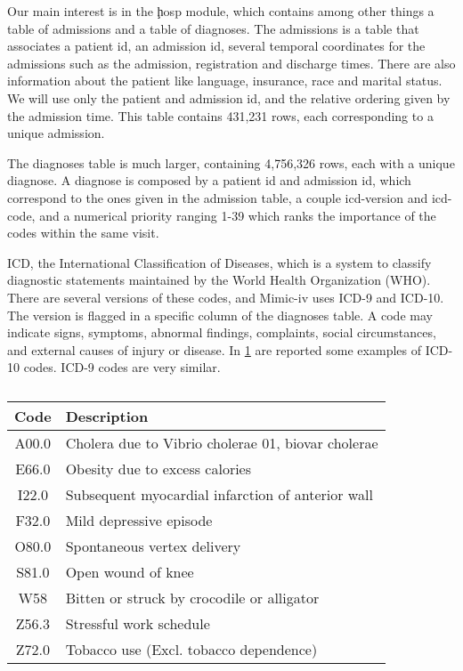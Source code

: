 \documentclass[]{marticle}
\begin{document}
Our main interest is in the \c{hosp} module, which contains among other things a table of admissions
and a table of diagnoses. The admissions is a table that associates a patient id, an admission id,
several temporal coordinates for the admissions such as the admission, registration and discharge
times. There are also information about the patient like language, insurance, race and marital
status. We will use only the patient and admission id, and the relative ordering given by the
admission time. This table contains 431,231 rows, each corresponding to a unique admission. 

The diagnoses table is much larger, containing 4,756,326 rows, each with a unique diagnose. A
diagnose is composed by a patient id and admission id, which correspond to the ones given in the
admission table, a couple icd-version and icd-code, and a numerical priority ranging 1-39 which
ranks the importance of the codes within the same visit.

ICD, the International Classification of Diseases, which is a system to classify diagnostic
statements maintained by the World Health Organization (WHO). There are several versions of these
codes, and Mimic-iv uses ICD-9 and ICD-10. The version is flagged in a specific column of the
diagnoses table. A code may indicate signs, symptoms, abnormal findings, complaints, social
circumstances, and external causes of injury or disease. In \ref{table:icd_examples} are reported some examples
of ICD-10 codes. ICD-9 codes are very similar.

\begin{table}[h]
\begin{center}
\begin{tabular}{  c  l  }
    \hline
    Code & Description \\ 
    \hline
    A00.0 & Cholera due to Vibrio cholerae 01, biovar cholerae \\ 
    E66.0 & Obesity due to excess calories \\ 
    I22.0 & Subsequent myocardial infarction of anterior wall \\ 
    F32.0 & Mild depressive episode \\ 
    O80.0 & Spontaneous vertex delivery \\ 
    S81.0 & Open wound of knee \\ 
    W58   & Bitten or struck by crocodile or alligator \\ 
    Z56.3 & Stressful work schedule \\ 
    Z72.0 & Tobacco use (Excl. tobacco dependence) \\ 
    \hline
\end{tabular}
\caption{}
\label{table:icd_examples}
\end{center}
\end{table}
\end{document}
